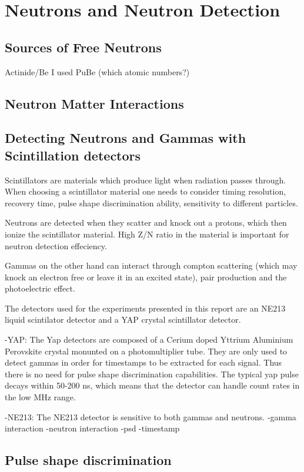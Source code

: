 \documentclass[main.tex]{subfiles}
\begin{document}
\section{Neutrons and Neutron Detection}
\subsection{Sources of Free Neutrons}
Actinide/Be
I used PuBe (which atomic numbers?)
\subsection{Neutron Matter Interactions}

\subsection{Detecting Neutrons and Gammas with Scintillation detectors}
Scintillators are materials which produce light when radiation passes through. When choosing a scintillator material one needs to consider timing resolution, recovery time, pulse shape discrimination ability, sensitivity to different particles.

Neutrons are detected when they scatter and knock out a protons, which then ionize the scintillator material. High Z/N ratio in the material is important for neutron detection effeciency.

Gammas on the other hand can interact through compton scattering (which may knock an electron free or leave it in an excited state), pair production and the photoelectric effect.

The detectors used for the experiments presented in this report are an NE213 liquid scintilator detector and a YAP crystal scintillator detector.

-YAP: The Yap detectors are composed of a Cerium doped Yttrium Aluminium Perovskite crystal monunted on a photomultiplier tube.
They are only used to detect gammas in order for timestamps to be extracted for each signal. Thus there is no need for pulse shape discrimination capabilities. The typical yap pulse decays within 50-200 ns, which means that the detector can handle count rates in the low MHz range.

-NE213: The NE213 detector is sensitive to both gammas and neutrons. 
-gamma interaction
-neutron interaction
-psd
-timestamp

\subsection{Pulse shape discrimination}
\end{document}
